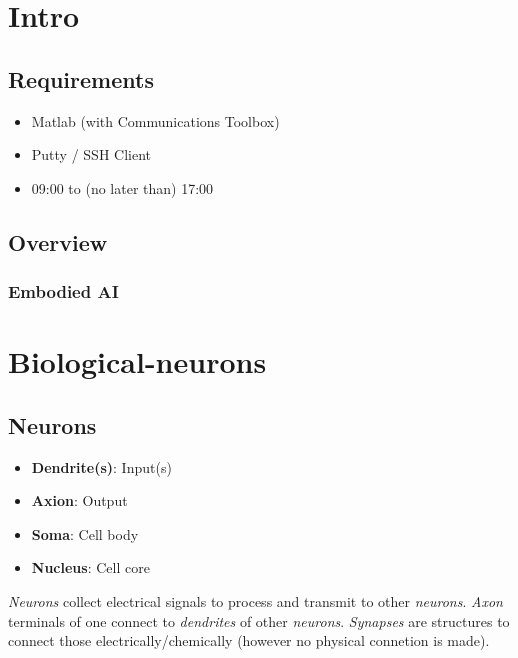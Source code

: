 \documentclass[
    fontsize      = 11pt,
    paper         = a4,
    twoside       = false,
    parskip       = half,
    pagesize      = false,
]{scrartcl}
\author{Robin Prillwitz}
\date{13 August 2022}
\providecommand{\tightlist}{%
  \setlength{\itemsep}{0pt}\setlength{\parskip}{0pt}}
\begin{document}
\tableofcontents

\clearpage
\newpage

\hypertarget{intro}{%
\section{Intro}\label{intro}}

\hypertarget{requirements}{%
\subsection{Requirements}\label{requirements}}

\begin{itemize}
\tightlist
\item
  Matlab (with Communications Toolbox)
\item
  Putty / SSH Client
\item
  09:00 to (no later than) 17:00
\end{itemize}

\hypertarget{overview}{%
\subsection{Overview}\label{overview}}

\hypertarget{embodied-ai}{%
\subsubsection{Embodied AI}\label{embodied-ai}}

\hypertarget{biological-neurons}{%
\section{Biological-neurons}\label{biological-neurons}}

\hypertarget{neurons}{%
\subsection{Neurons}\label{neurons}}

\begin{itemize}
\tightlist
\item
  \textbf{Dendrite(s)}: Input(s)
\item
  \textbf{Axion}: Output
\item
  \textbf{Soma}: Cell body
\item
  \textbf{Nucleus}: Cell core
\end{itemize}

\emph{Neurons} collect electrical signals to process and transmit to
other \emph{neurons}. \emph{Axon} terminals of one connect to
\emph{dendrites} of other \emph{neurons}. \emph{Synapses} are structures
to connect those electrically/chemically (however no physical connetion
is made).
\end{document}
